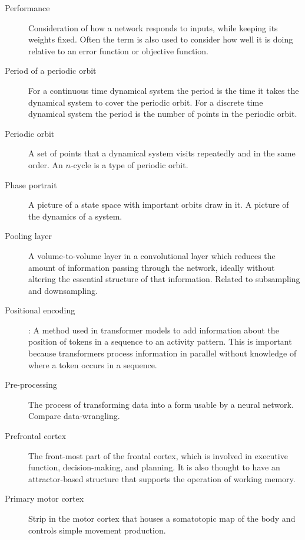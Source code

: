 \begin{description}

\item[Performance] Consideration of how a network responds to inputs, while keeping its weights fixed.  Often the term is also used to consider how well it is doing relative to an error function or objective function.

\item[Period of a periodic orbit] For a continuous time dynamical system the period is the time it takes the dynamical system to cover the periodic orbit. For a discrete time dynamical system the period is the number of points in the periodic orbit.

\item[Periodic orbit] A set of points that a dynamical system visits repeatedly and in the same order. An $n$-cycle is a type of periodic orbit.

\item[Phase portrait] A picture of a state space with important orbits draw in it. A picture of the dynamics of a system.

\item[Pooling layer] A volume-to-volume layer in a convolutional layer which reduces the amount of information passing through the network, ideally without altering the essential structure of that information. Related to subsampling and downsampling. 

\item[Positional encoding]: A method used in transformer models to add information about the position of tokens in a sequence to an activity pattern. This is important because transformers process information in parallel without knowledge of where a token occurs in a sequence.

\item[Pre-processing] The process of transforming data into a form usable by a neural network. Compare data-wrangling.


\item[Prefrontal cortex] The front-most part of the frontal cortex, which is involved in executive function, decision-making, and planning. It is also thought to have an attractor-based structure that supports the operation of working memory.

\item[Primary motor cortex] Strip in the motor cortex that houses a somatotopic map of the body and controls simple movement production. 


\end{description}
